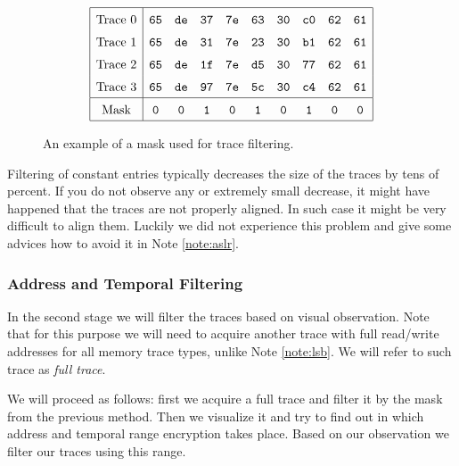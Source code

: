 	\begin{figure}[H]
	\[
	\arraycolsep=.5em\def\arraystretch{1.5}
		\begin{array}{|c|ccccccccc|}
			\hline
			\textnormal{Trace 0} & {\tt 65} & {\tt de} & {\tt 37} & {\tt 7e} & {\tt 63} & {\tt 30} & {\tt c0} & {\tt 62} & {\tt 61} \\
			\textnormal{Trace 1} & {\tt 65} & {\tt de} & {\tt 31} & {\tt 7e} & {\tt 23} & {\tt 30} & {\tt b1} & {\tt 62} & {\tt 61} \\
			\textnormal{Trace 2} & {\tt 65} & {\tt de} & {\tt 1f} & {\tt 7e} & {\tt d5} & {\tt 30} & {\tt 77} & {\tt 62} & {\tt 61} \\
			\textnormal{Trace 3} & {\tt 65} & {\tt de} & {\tt 97} & {\tt 7e} & {\tt 5c} & {\tt 30} & {\tt c4} & {\tt 62} & {\tt 61} \\
			\hline
			\textnormal{Mask}    & {\tt 0}  & {\tt 0}  & {\tt 1}  & {\tt 0}  & {\tt 1}  & {\tt 0}  & {\tt 1}  & {\tt 0}  & {\tt 0} \\
			\hline
		\end{array}
	\]
	\caption{An example of a mask used for trace filtering.}
	\label{fig:constmask}
	\end{figure}
	
	\begin{note}
	\label{note:filter}
		Filtering of constant entries typically decreases the size of the traces by tens of percent. If you do not observe any or extremely small decrease, it might have happened that the traces are not properly aligned. In such case it might be very difficult to align them. Luckily we did not experience this problem and give some advices how to avoid it in Note \ref{note:aslr}.
	\end{note}

\subsubsection{Address and Temporal Filtering}
	
	In the second stage we will filter the traces based on visual observation. Note that for this purpose we will need to acquire another trace with full read/write addresses for all memory trace types, unlike Note \ref{note:lsb}. We will refer to such trace as {\em full trace}.
	
	We will proceed as follows: first we acquire a full trace and filter it by the mask from the previous method. Then we visualize it and try to find out in which address and temporal range encryption takes place. Based on our observation we filter our traces using this range.
	
